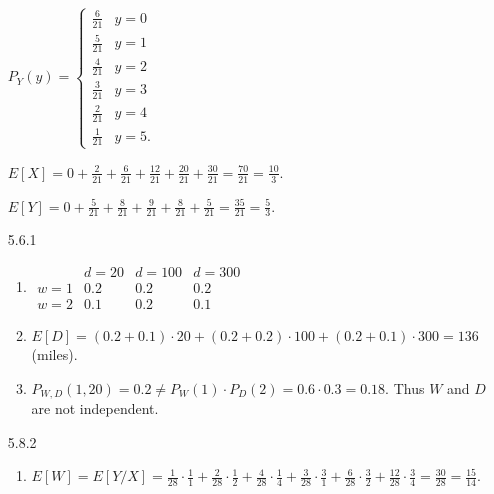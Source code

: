 \documentclass{article}
\begin{document}
\begin{enumerate}
    $P_Y(y) = \begin{cases}
        \frac{6}{21} & y = 0 \\
        \frac{5}{21} & y = 1 \\
        \frac{4}{21} & y = 2 \\
        \frac{3}{21} & y = 3 \\
        \frac{2}{21} & y = 4 \\
        \frac{1}{21} & y = 5.
    \end{cases}
    $

    $E[X] = 0 + \frac{2}{21} + \frac{6}{21} + \frac{12}{21} + \frac{20}{21} + \frac{30}{21} = \frac{70}{21} = \frac{10}{3}$.

    $E[Y] = 0 + \frac{5}{21} + \frac{8}{21} + \frac{9}{21} + \frac{8}{21} + \frac{5}{21} = \frac{35}{21} = \frac{5}{3}$.

    \item [5.6.1]

    \begin{enumerate}[label=(\alph*)]
        \item
            $
            \begin{array}{c|ccc}
                & d = 20 & d = 100 & d = 300 \\
            \hline
            w = 1 & 0.2    & 0.2     & 0.2 \\
            w = 2 & 0.1    & 0.2     & 0.1
            \end{array}
            $


        \item
            $E[D] = (0.2 + 0.1) \cdot 20 + (0.2 + 0.2) \cdot 100 + (0.2 + 0.1) \cdot 300 = 136$ (miles).

        \item $P_{W, D}(1, 20) = 0.2 \ne P_W(1) \cdot P_D(2) = 0.6 \cdot 0.3 = 0.18$. Thus $W$ and $D$ are not independent.
    \end{enumerate}

    \item [5.8.2]

    \begin{enumerate}[label=(\alph*)]
        \item 
        $E[W] = E[Y / X] = \frac{1}{28} \cdot \frac{1}{1}                  
                         + \frac{2}{28} \cdot \frac{1}{2}
                         + \frac{4}{28} \cdot \frac{1}{4}
                         + \frac{3}{28} \cdot \frac{3}{1}
                         + \frac{6}{28} \cdot \frac{3}{2}
                         + \frac{12}{28} \cdot \frac{3}{4} = \frac{30}{28} = \frac{15}{14}$.


\end{enumerate}
\end{enumerate}
\end{document}
